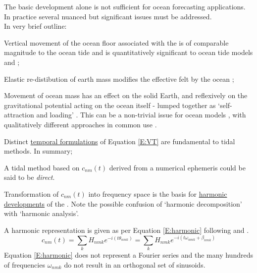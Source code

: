 
The basic \ATGP{} development alone is not sufficient for ocean forecasting applications. In practice several nuanced but significant issues must be addressed.\\
In very brief outline:
\begin{compactitem}
\item Vertical movement of the ocean floor associated with the \ATGP{} is of comparable magnitude to the ocean tide and is quantitatively significant to ocean tide models \citep{Hendershott:1981ub} and \citep[pp.336]{gill1982atmosphere};
\item Elastic re-distibution of earth mass modifies the effective \ATGP{} felt by the ocean \citep{Agnew:2011ub};
\item Movement of ocean mass has an effect on the solid Earth, and reflexively on the gravitational potential acting on the ocean itself - lumped together as `self-attraction and loading' \SAL{}.  This can be a non-trivial issue for ocean models \citep{Ray:1998jl}, with qualitatively different approaches in common use \cite{Stepanov:2004up} \citep{Egbert:2002ug}.
\end{compactitem}




Distinct \underline{temporal formulations} of Equation \ref{E:VT} are fundamental to tidal methods.  
In summary;
\begin{compactitem}
\item A tidal method based on $c_{nm}(t)$ derived from a numerical ephemeris could be said to be \emph{direct}.\\
\item Transformation of $c_{nm}(t)$ into frequency space is the basis for \underline{harmonic developments} of the \ATGP{}. Note the possible confusion of `harmonic decomposition' with `harmonic analysis'.
\end{compactitem}

A harmonic representation is given as per Equation \ref{E:harmonic} following \citep{Desai:2006wo} and \citep[Eq 13]{Cartwright:1971iz}.\\
\begin{equation}
\label{E:harmonic}
c_{nm}(t) = \sum_{k} H_{nmk} e^{-i( t\theta_{nmk})} = \sum_{k} H_{nmk} e^{-i( t\omega_{nmk} + \beta_{nmk})}
\end{equation} 
Equation \ref{E:harmonic} does not represent a Fourier series and the many hundreds of frequencies $\omega_{nmk}$ do not result in an orthogonal set of sinusoids.\\


